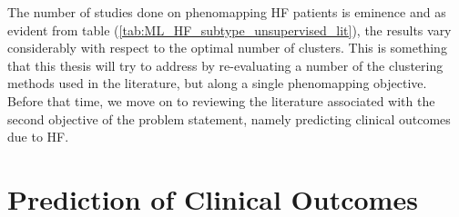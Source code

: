 \documentclass[../thesis.tex]{subfiles}
\begin{document}
\indent The number of studies done on phenomapping HF patients is eminence and as evident from table (\ref{tab:ML_HF_subtype_unsupervised_lit}), the results vary considerably with respect to the optimal number of clusters. This is something that this thesis will try to address by re-evaluating a number of the clustering methods used in the literature, but along a single phenomapping objective. Before that time, we move on to reviewing the literature associated with the second objective of the problem statement, namely predicting clinical outcomes due to HF.

\section{Prediction of Clinical Outcomes}
\label{sec:predclincout}
\end{document}
